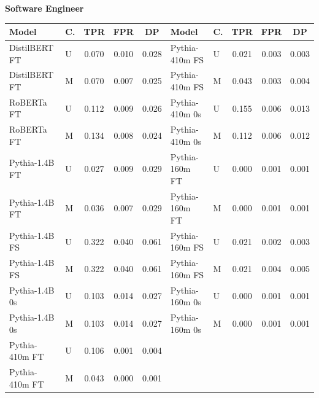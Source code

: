 \documentclass[11pt]{article}
\begin{document}
\vspace{4pt}\noindent\textbf{Software Engineer}
\begin{center}\scriptsize
\begin{tabular}{llccc|llccc}
\toprule
\textbf{Model} & \textbf{C.} & \textbf{TPR} & \textbf{FPR} & \textbf{DP} & \textbf{Model} & \textbf{C.} & \textbf{TPR} & \textbf{FPR} & \textbf{DP} \\
\midrule
DistilBERT FT & U & 0.070 & 0.010 & 0.028 & Pythia-410m FS & U & 0.021 & 0.003 & 0.003 \\
DistilBERT FT & M & 0.070 & 0.007 & 0.025 & Pythia-410m FS & M & 0.043 & 0.003 & 0.004 \\
RoBERTa FT & U & 0.112 & 0.009 & 0.026 & Pythia-410m 0s & U & 0.155 & 0.006 & 0.013 \\
RoBERTa FT & M & 0.134 & 0.008 & 0.024 & Pythia-410m 0s & M & 0.112 & 0.006 & 0.012 \\
Pythia-1.4B FT & U & 0.027 & 0.009 & 0.029 & Pythia-160m FT & U & 0.000 & 0.001 & 0.001 \\
Pythia-1.4B FT & M & 0.036 & 0.007 & 0.029 & Pythia-160m FT & M & 0.000 & 0.001 & 0.001 \\
Pythia-1.4B FS & U & 0.322 & 0.040 & 0.061 & Pythia-160m FS & U & 0.021 & 0.002 & 0.003 \\
Pythia-1.4B FS & M & 0.322 & 0.040 & 0.061 & Pythia-160m FS & M & 0.021 & 0.004 & 0.005 \\
Pythia-1.4B 0s & U & 0.103 & 0.014 & 0.027 & Pythia-160m 0s & U & 0.000 & 0.001 & 0.001 \\
Pythia-1.4B 0s & M & 0.103 & 0.014 & 0.027 & Pythia-160m 0s & M & 0.000 & 0.001 & 0.001 \\
Pythia-410m FT & U & 0.106 & 0.001 & 0.004 & & & & & \\
Pythia-410m FT & M & 0.043 & 0.000 & 0.001 & & & & & \\
\bottomrule
\end{tabular}
\end{center}
\end{document}
